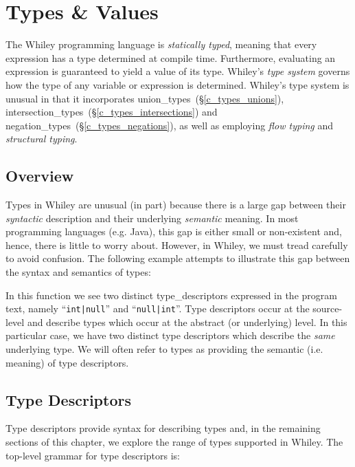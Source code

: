 \chapter{Types \& Values}
The Whiley programming language is {\em statically typed}, meaning that every expression has a type determined at compile time.  Furthermore, evaluating an expression is guaranteed to yield a value of its type.  Whiley's {\em type system} governs how the type of any variable or expression is determined.  Whiley's type system is unusual in that it incorporates \gls{union_type}s~(\S\ref{c_types_unions}), \gls{intersection_type}s~(\S\ref{c_types_intersections}) and \gls{negation_type}s~(\S\ref{c_types_negations}), as well as employing {\em flow typing} and {\em structural typing}.

\section{Overview}
\label{c_types_type_overview}

Types in Whiley are unusual (in part) because there is a large gap between their {\em syntactic} description and their underlying {\em semantic} meaning.  In most programming languages (e.g. Java), this gap is either small or non-existent and, hence, there is little to worry about.  However, in Whiley, we must tread carefully to avoid confusion.  The following example attempts to illustrate this gap between the syntax and semantics of types:



In this function we see two distinct \gls{type_descriptor}s expressed in the program text, namely ``\lstinline{int|null}'' and ``\lstinline{null|int}''.  Type descriptors occur at the source-level and describe \gls{type}s which occur at the abstract (or underlying) level.  In this particular case, we have two distinct type descriptors which describe the {\em same} underlying type.  We will often refer to types as providing the semantic (i.e. meaning) of type descriptors.  

\pagebreak

\section{Type Descriptors}
\label{c_types_type_descriptors}
Type descriptors provide syntax for describing types and, in the remaining sections of this chapter, we explore the range of types supported in Whiley.  The top-level grammar for type descriptors is:

